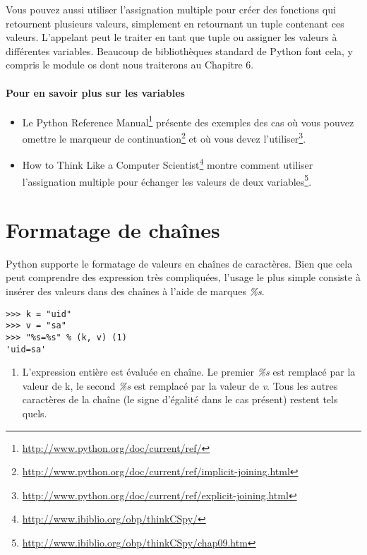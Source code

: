 Vous pouvez aussi utiliser l'assignation multiple pour créer des fonctions qui retournent plusieurs valeurs, simplement en retournant un tuple contenant ces valeurs. L'appelant peut le traiter en tant que tuple ou assigner les valeurs à différentes variables. Beaucoup de bibliothèques standard de Python font cela, y compris le module os dont nous traiterons au Chapitre 6.

\paragraph{Pour en savoir plus sur les variables}
\begin{itemize}
\item{Le Python Reference Manual\footnote{\url{http://www.python.org/doc/current/ref/}} présente des exemples des cas où vous pouvez omettre le marqueur de continuation\footnote{\url{http://www.python.org/doc/current/ref/implicit-joining.html}} et où vous devez l'utiliser\footnote{\url{http://www.python.org/doc/current/ref/explicit-joining.html}}.}
\item{How to Think Like a Computer Scientist\footnote{\url{http://www.ibiblio.org/obp/thinkCSpy/}} montre comment utiliser l'assignation multiple pour échanger les valeurs de deux variables\footnote{\url{http://www.ibiblio.org/obp/thinkCSpy/chap09.htm}}.}
\end{itemize}

\section{Formatage de chaînes}

Python supporte le formatage de valeurs en chaînes de caractères. Bien que cela peut comprendre des expression très compliquées, l'usage le plus simple consiste à insérer des valeurs dans des chaînes à l'aide de marques \emph{\%s}.


\begin{example}
\begin{lstlisting}
>>> k = "uid"
>>> v = "sa"
>>> "%s=%s" % (k, v) (1)
'uid=sa'
\end{lstlisting}
\end{example}

\begin{enumerate}
\item L'expression entière est évaluée en chaîne. Le premier \emph{\%s} est remplacé par la valeur de k, le second \emph{\%s} est remplacé par la valeur de \emph{v}. Tous les autres caractères de la chaîne (le signe d'égalité dans le cas présent) restent tels quels.
\end{enumerate}

